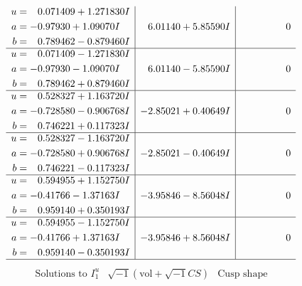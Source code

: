 \documentclass[1p]{elsarticle_modified}
\theoremstyle{definition}
\newcommand{\I}{\sqrt{-1}}
\begin{document}
$$\begin{array}{c|c|c}
\begin{aligned}
u &= \phantom{-}0.071409 + 1.271830 I \\
a &= -0.97930 + 1.09070 I \\
b &= \phantom{-}0.789462 - 0.879460 I\end{aligned}
 & \phantom{-}6.01140 + 5.85590 I & \phantom{-0.000000 } 0 \\ \hline\begin{aligned}
u &= \phantom{-}0.071409 - 1.271830 I \\
a &= -0.97930 - 1.09070 I \\
b &= \phantom{-}0.789462 + 0.879460 I\end{aligned}
 & \phantom{-}6.01140 - 5.85590 I & \phantom{-0.000000 } 0 \\ \hline\begin{aligned}
u &= \phantom{-}0.528327 + 1.163720 I \\
a &= -0.728580 - 0.906768 I \\
b &= \phantom{-}0.746221 + 0.117323 I\end{aligned}
 & -2.85021 + 0.40649 I & \phantom{-0.000000 } 0 \\ \hline\begin{aligned}
u &= \phantom{-}0.528327 - 1.163720 I \\
a &= -0.728580 + 0.906768 I \\
b &= \phantom{-}0.746221 - 0.117323 I\end{aligned}
 & -2.85021 - 0.40649 I & \phantom{-0.000000 } 0 \\ \hline\begin{aligned}
u &= \phantom{-}0.594955 + 1.152750 I \\
a &= -0.41766 - 1.37163 I \\
b &= \phantom{-}0.959140 + 0.350193 I\end{aligned}
 & -3.95846 - 8.56048 I & \phantom{-0.000000 } 0 \\ \hline\begin{aligned}
u &= \phantom{-}0.594955 - 1.152750 I \\
a &= -0.41766 + 1.37163 I \\
b &= \phantom{-}0.959140 - 0.350193 I\end{aligned}
 & -3.95846 + 8.56048 I & \phantom{-0.000000 } 0\\
 \hline 
 \end{array}$$\newpage$$\begin{array}{c|c|c}  
\text{Solutions to }I^u_{1}& \I (\text{vol} + \sqrt{-1}CS) & \text{Cusp shape}\\
 \hline 
\begin{aligned}

\end{aligned}
\end{array}$$
\end{document}
